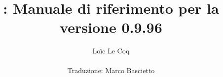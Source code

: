 \documentclass[a4paper,11pt]{book}
\author{Loïc Le Coq\\ \\ Traduzione: Marco Bascietto}
\title{
\Huge \textbf{\xlogo: Manuale di riferimento per la versione 0.9.96} 
}
\date{
\today
\begin{center}
\texttt{[image: pics/title.png]}
\end{center}
\texttt{http://xlogo.tuxfamily.org}
}
\begin{document}
\renewcommand{\labelitemi}{\textbullet}
\renewcommand{\labelitemiii}{$\rightarrow$} 
\maketitle

\tableofcontents













\appendix






\printindex
\end{document}
